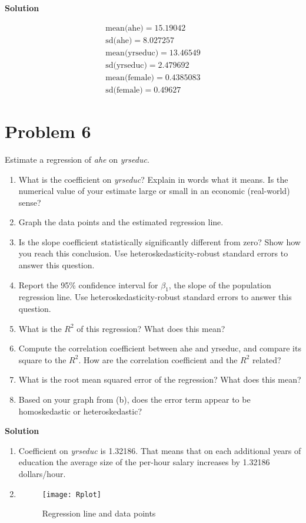 \documentclass[a4paper]{article}
\begin{document}
\textbf{Solution}


\begin{align*}
\text{mean(ahe)} = 15.19042\\
\text{sd(ahe)} = 8.027257\\
\text{mean(yrseduc)} = 13.46549\\
\text{sd(yrseduc)} = 2.479692\\
\text{mean(female)} = 0.4385083\\
\text{sd(female)} = 0.49627
\end{align*}
\section*{Problem 6}
 Estimate a regression of \textit{ahe} on \textit{yrseduc}.
 \begin{enumerate}
 	\item What is the coefficient on \textit{yrseduc}? Explain in words what it means. Is the numerical
value of your estimate large or small in an economic (real-world) sense?
\item Graph the data points and the estimated regression line.
\item Is the slope coefficient statistically significantly different from zero? Show how you reach
this conclusion. Use heteroskedasticity-robust standard errors to answer this question.
\item Report the 95\% confidence interval for $\beta_1$, the slope of the population regression line.
Use heteroskedasticity-robust standard errors to answer this question.
\item  What is the $R^2$ of this regression? What does this mean?
\item  Compute the correlation coefficient between ahe and yrseduc, and compare its square to
the $R^2$. How are the correlation coefficient and the $R^2$
related?
\item What is the root mean squared error of the regression? What does this mean?
\item Based on your graph from (b), does the error term appear to be homoskedastic or
heteroskedastic?

\end{enumerate}


\textbf{Solution}
\begin{enumerate}
	\item Coefficient on \textit{yrseduc} is 1.32186. That means that on each additional years of education the average size of the per-hour salary increases by 1.32186 dollars/hour.
	\item \begin{figure}[h]
		\centering
		\texttt{[image: Rplot]}
		\caption{Regression line and data points}
	\end{figure}
\end{enumerate}
\end{document}
